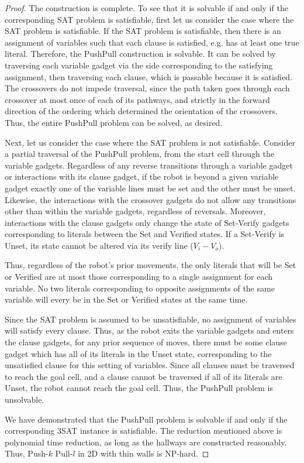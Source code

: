 \begin{proof}
    The construction is complete. To see that it is solvable if and only if the corresponding SAT problem is satisfiable, first let us consider the case where the SAT problem is satisfiable. If the SAT problem is satisfiable, then there is an assignment of variables such that each clause is satisfied, e.g. has at least one true literal. Therefore, the PushPull construction is solvable. It can be solved by traversing each variable gadget via the side corresponding to the satisfying assignment, then traversing each clause, which is passable because it is satisfied. The crossovers do not impede traversal, since the path taken goes through each crossover at most once of each of its pathways, and strictly in the forward direction of the ordering which determined the orientation of the crossovers. Thus, the entire PushPull problem can be solved, as desired.

    Next, let us consider the case where the SAT problem is not satisfiable. Consider a partial traversal of the PushPull problem, from the start cell through the variable gadgets. Regardless of any reverse transitions through a variable gadget or interactions with its clause gadget, if the robot is beyond a given variable gadget exactly one of the variable lines must be set and the other must be unset. Likewise, the interactions with the crossover gadgets do not allow any transitions other than within the variable gadgets, regardless of reversals. Moreover, interactions with the clause gadgets only change the state of Set-Verify gadgets corresponding to literals between the Set and Verified states. If a Set-Verify is Unset, its state cannot be altered via its verify line ($V_i - V_o$).

    Thus, regardless of the robot's prior movements, the only literals that will be Set or Verified are at most those corresponding to a single assignment for each variable. No two literals corresponding to opposite assignments of the same variable will every be in the Set or Verified states at the same time. 

    Since the SAT problem is assumed to be unsatisfiable, no assignment of variables will satisfy every clause. Thus, as the robot exits the variable gadgets and enters the clause gadgets, for any prior sequence of moves, there must be some clause gadget which has all of its literals in the Unset state, corresponding to the unsatisfied clause for this setting of variables. Since all clauses must be traversed to reach the goal cell, and a clause cannot be traversed if all of its literals are Unset, the robot cannot reach the goal cell. Thus, the PushPull problem is unsolvable.

    We have demonstrated that the PushPull problem is solvable if and only if the corresponding 3SAT instance is satisfiable. The reduction mentioned above is polynomial time reduction, as long as the hallways are constructed reasonably. Thus, Push-$k$ Pull-$l$ in 2D with thin walls is NP-hard.

\end{proof}

